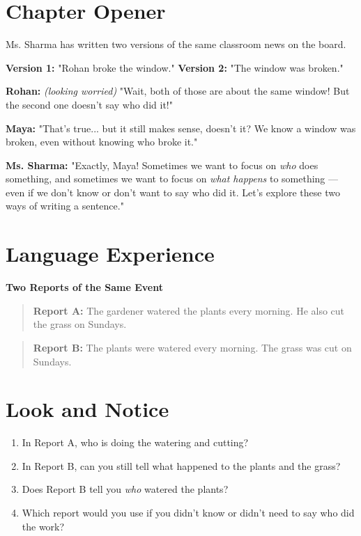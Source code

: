 \section{Chapter Opener}
Ms. Sharma has written two versions of the same classroom news on the board.

\textbf{Version 1:} "Rohan broke the window."
\textbf{Version 2:} "The window was broken."

\textbf{Rohan:} \textit{(looking worried)} "Wait, both of those are about the same window! But the second one doesn't say who did it!"

\textbf{Maya:} "That's true... but it still makes sense, doesn't it? We know a window was broken, even without knowing who broke it."

\textbf{Ms. Sharma:} "Exactly, Maya! Sometimes we want to focus on \textit{who} does something, and sometimes we want to focus on \textit{what happens} to something — even if we don't know or don't want to say who did it. Let's explore these two ways of writing a sentence."

\section{Language Experience}
\textbf{Two Reports of the Same Event}

\begin{quote}
\textbf{Report A:} The gardener watered the plants every morning. He also cut the grass on Sundays.
\end{quote}

\begin{quote}
\textbf{Report B:} The plants were watered every morning. The grass was cut on Sundays.
\end{quote}

\section{Look and Notice}
\begin{thinkbox}
\begin{enumerate}
    \item In Report A, who is doing the watering and cutting?
    \item In Report B, can you still tell what happened to the plants and the grass?
    \item Does Report B tell you \textit{who} watered the plants?
    \item Which report would you use if you didn't know or didn't need to say who did the work?
\end{enumerate}
\end{thinkbox}

